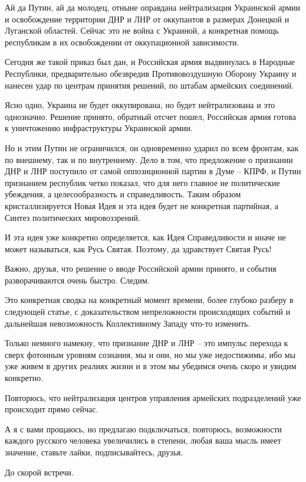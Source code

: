 \begin{zznagolos}
Ай да Путин, ай да молодец, отныне оправдана нейтрализация Украинской армии и
освобождение территории ДНР и ЛНР от оккупантов в размерах Донецкой и Луганской
областей. Сейчас это не война с Украиной, а конкретная помощь республикам в их
освобождении от оккупационной зависимости.	
\end{zznagolos}

Сегодня же такой приказ был дан, и Российская армия выдвинулась в Народные
Республики, предварительно обезвредив Противовоздушную Оборону Украину и
нанесен удар по центрам принятия решений, по штабам армейских соединений.

Ясно одно, Украина не будет оккупирована, но будет нейтрализована и это
однозначно. Решение принято, обратный отсчет пошел, Российская армия готова к
уничтожению инфраструктуры Украинской армии.

Но и этим Путин не ограничился, он одновременно ударил по всем фронтам, как по
внешнему, так и по внутреннему. Дело в том, что предложение о признании ДНР и
ЛНР поступило от самой оппозиционной партии в Думе – КПРФ, и Путин признанием
республик четко показал, что для него главное не политические убеждения, а
целесообразность и справедливость. Таким образом кристаллизируется Новая Идея и
эта идея будет не конкретная партийная, а Синтез политических мировоззрений.

\begin{zznagolos}
И эта идея уже конкретно определяется, как Идея Справедливости и иначе не может
называться, как Русь Святая. Поэтому, да здравствует Святая Русь!	
\end{zznagolos}

Важно, друзья, что решение о вводе Российской армии принято, и события
разворачиваются очень быстро. Следим.

Это конкретная сводка на конкретный момент времени, более глубоко разберу в
следующей статье, с доказательством непреложности происходящих событий и
дальнейшая невозможность Коллективному Западу что-то изменить.

\begin{zznagolos}
Только немного намекну, что признание ДНР и ЛНР – это импульс перехода к сверх
фотонным уровням сознания, мы и они, но мы уже недостижимы, ибо мы уже живем в
других реалиях жизни и в этом мы убедимся очень скоро и увидим конкретно.	
\end{zznagolos}

Повторюсь, что нейтрализация центров управления армейских подразделений уже
происходит прямо сейчас.

А я с вами прощаюсь, но предлагаю подключаться, повторюсь, возможности каждого
русского человека увеличились в степени, любая ваша мысль имеет значение,
ставьте лайки, подписывайтесь, друзья.

До скорой встречи.
